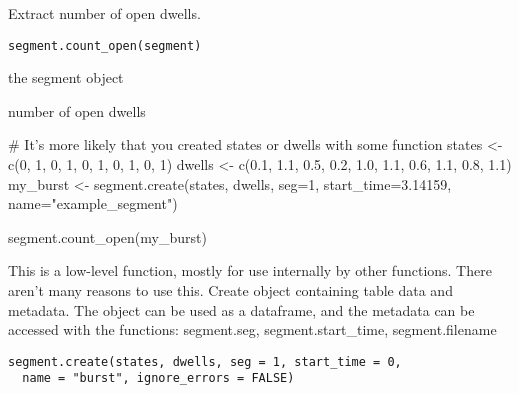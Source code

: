 \documentclass[letterpaper]{book}
\begin{document}
%
\begin{Description}\relax
Extract number of open dwells.
\end{Description}
%
\begin{Usage}
\begin{verbatim}
segment.count_open(segment)
\end{verbatim}
\end{Usage}
%
\begin{Arguments}
\begin{ldescription}
\item[\code{segment}] the segment object
\end{ldescription}
\end{Arguments}
%
\begin{Value}
number of open dwells
\end{Value}
%
\begin{Examples}
\begin{ExampleCode}

# It's more likely that you created states or dwells with some function
states  <-  c(0,      1,    0,    1,    0,    1,    0,    1,    0,    1)
dwells  <-  c(0.1,  1.1,  0.5,  0.2,  1.0,  1.1,  0.6,  1.1,  0.8,  1.1)
my_burst <- segment.create(states, dwells, seg=1, start_time=3.14159, name="example_segment")

segment.count_open(my_burst)

\end{ExampleCode}
\end{Examples}
%
\begin{Description}\relax
This is a low-level function, mostly for use internally by other functions. There aren't many reasons to use this. Create object containing table data and metadata. The object can be used as a dataframe, and the metadata can be accessed with the functions: segment.seg, segment.start\_time, segment.filename
\end{Description}
%
\begin{Usage}
\begin{verbatim}
segment.create(states, dwells, seg = 1, start_time = 0,
  name = "burst", ignore_errors = FALSE)
\end{verbatim}
\end{Usage}
%
\end{document}
